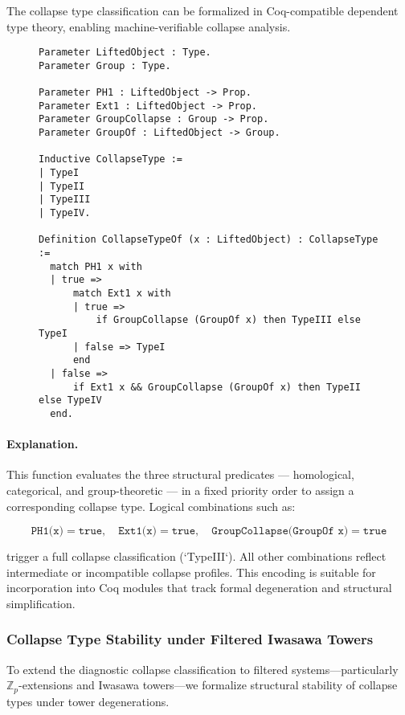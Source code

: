 \documentclass[11pt]{article}
\begin{document}
The collapse type classification can be formalized in Coq-compatible dependent type theory, enabling machine-verifiable collapse analysis.

\begin{figure}[h]
\centering
\begin{lstlisting}[language=Coq, caption=Collapse Type Assignment in Coq]
Parameter LiftedObject : Type.
Parameter Group : Type.

Parameter PH1 : LiftedObject -> Prop.
Parameter Ext1 : LiftedObject -> Prop.
Parameter GroupCollapse : Group -> Prop.
Parameter GroupOf : LiftedObject -> Group.

Inductive CollapseType :=
| TypeI
| TypeII
| TypeIII
| TypeIV.

Definition CollapseTypeOf (x : LiftedObject) : CollapseType :=
  match PH1 x with
  | true =>
      match Ext1 x with
      | true =>
          if GroupCollapse (GroupOf x) then TypeIII else TypeI
      | false => TypeI
      end
  | false =>
      if Ext1 x && GroupCollapse (GroupOf x) then TypeII else TypeIV
  end.
\end{lstlisting}
\end{figure}

\paragraph{Explanation.}
This function evaluates the three structural predicates — homological, categorical, and group-theoretic — in a fixed priority order to assign a corresponding collapse type. Logical combinations such as:

\[
\texttt{PH1(x)} = \texttt{true},\quad \texttt{Ext1(x)} = \texttt{true},\quad \texttt{GroupCollapse(GroupOf x)} = \texttt{true}
\]

trigger a full collapse classification (`TypeIII`). All other combinations reflect intermediate or incompatible collapse profiles. This encoding is suitable for incorporation into Coq modules that track formal degeneration and structural simplification.

\subsubsection*{Collapse Type Stability under Filtered Iwasawa Towers}

To extend the diagnostic collapse classification to filtered systems—particularly $\mathbb{Z}_p$-extensions and Iwasawa towers—we formalize structural stability of collapse types under tower degenerations.
\end{document}

